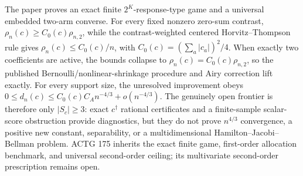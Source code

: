 The paper proves an exact finite \(2^K\)-response-type game and a universal embedded two-arm converse.  For every fixed nonzero zero-sum contrast, \(\rho_n(c)\geq C_0(c)\rho_{n,2}\), while the contrast-weighted centered Horvitz--Thompson rule gives \(\rho_n(c)\leq C_0(c)/n\), with \(C_0(c)=(\sum_a|c_a|)^2/4\).  When exactly two coefficients are active, the bounds collapse to \(\rho_n(c)=C_0(c)\rho_{n,2}\), so the published Bernoulli/nonlinear-shrinkage procedure and Airy correction lift exactly.  For every support size, the unresolved improvement obeys \(0\leq d_n(c)\leq C_0(c)C_A n^{-4/3}+o(n^{-4/3})\).  The genuinely open frontier is therefore only \(|S_c|\geq3\): exact \(c^\dagger\) rational certificates and a finite-sample scalar-score obstruction provide diagnostics, but they do not prove \(n^{4/3}\) convergence, a positive new constant, separability, or a multidimensional Hamilton--Jacobi--Bellman problem.  ACTG 175 inherits the exact finite game, first-order allocation benchmark, and universal second-order ceiling; its multivariate second-order prescription remains open.